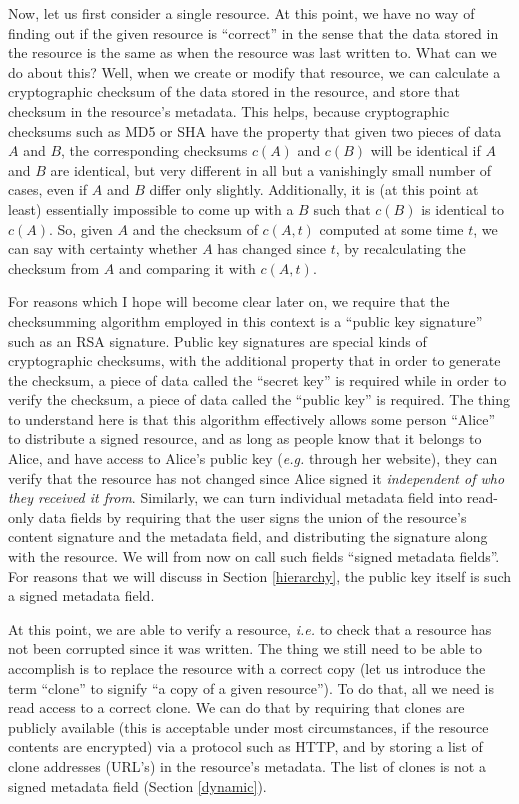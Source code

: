 \documentclass[11pt]{article}
\begin{document}
\begin{mainmatter}
Now, let us first consider a single resource. At this point, we have no way of finding out if the given resource is ``correct'' in the sense that the data stored in the resource is the same as when the resource was last written to. What can we do about this? Well, when we create or modify that resource, we can calculate a cryptographic checksum of the data stored in the resource, and store that checksum in the resource's metadata. This helps, because cryptographic checksums such as MD5 or SHA have the property that given two pieces of data $A$ and $B$, the corresponding checksums $c(A)$ and $c(B)$ will be identical if $A$ and $B$ are identical, but very different in all but a vanishingly small number of cases, even if $A$ and $B$ differ only slightly. Additionally, it is (at this point at least) essentially impossible to come up with a $B$ such that $c(B)$ is identical to $c(A)$. So, given $A$ and the checksum of $c(A, t)$ computed at some time $t$, we can say with certainty whether $A$ has changed since $t$, by recalculating the checksum from $A$ and comparing it with $c(A,t)$. 

For reasons which I hope will become clear later on, we require that the checksumming algorithm employed in this context is a ``public key signature'' such as an RSA signature. Public key signatures are special kinds of cryptographic checksums, with the additional property that in order to generate the checksum, a piece of data called the ``secret key'' is required while in order to verify the checksum, a piece of data called the ``public key'' is required. The thing to understand here is that this algorithm effectively allows some person ``Alice'' to distribute a signed resource, and as long as people know that it belongs to Alice, and have access to Alice's public key (\emph{e.g.} through her website), they can verify that the resource has not changed since Alice signed it \emph{independent of who they received it from}. Similarly, we can turn individual metadata field into read-only data fields by requiring that the user signs the union of the resource's content signature and the metadata field, and distributing the signature along with the resource. We will from now on call such fields ``signed metadata fields''. For reasons that we will discuss in Section \ref{hierarchy}, the public key itself is such a signed metadata field.

At this point, we are able to verify a resource, \emph{i.e.} to check that a resource has not been corrupted since it was written. The thing we still need to be able to accomplish is to replace the resource with a correct copy (let us introduce the term ``clone'' to signify ``a copy of a given resource''). To do that, all we need is read access to a correct clone.  We can do that by requiring that clones are publicly available (this is acceptable under most circumstances, if the resource contents are encrypted) via a protocol such as HTTP, and by storing a list of clone addresses (URL's) in the resource's metadata. The list of clones is not a signed metadata field (Section \ref{dynamic}).


\end{mainmatter}
\end{document}
